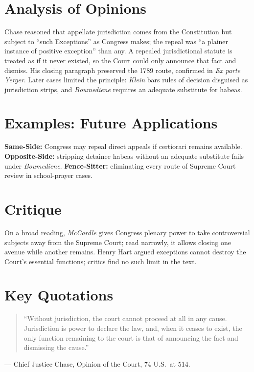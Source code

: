 \documentclass[12pt]{article}
\begin{document}
\section{Analysis of Opinions}
Chase reasoned that appellate jurisdiction comes from the Constitution but subject to ``such Exceptions'' as Congress makes; the repeal was ``a plainer instance of positive exception'' than any. A repealed jurisdictional statute is treated as if it never existed, so the Court could only announce that fact and dismiss. His closing paragraph preserved the 1789 route, confirmed in \textit{Ex parte Yerger}. Later cases limited the principle: \textit{Klein} bars rules of decision disguised as jurisdiction strips, and \textit{Boumediene} requires an adequate substitute for habeas.

\section{Examples: Future Applications}
\textbf{Same-Side:} Congress may repeal direct appeals if certiorari remains available. \textbf{Opposite-Side:} stripping detainee habeas without an adequate substitute fails under \textit{Boumediene}. \textbf{Fence-Sitter:} eliminating every route of Supreme Court review in school-prayer cases.

\section{Critique}
On a broad reading, \textit{McCardle} gives Congress plenary power to take controversial subjects away from the Supreme Court; read narrowly, it allows closing one avenue while another remains. Henry Hart argued exceptions cannot destroy the Court's essential functions; critics find no such limit in the text.

\section{Key Quotations}
\begin{quote}
``Without jurisdiction, the court cannot proceed at all in any cause. Jurisdiction is power to declare the law, and, when it ceases to exist, the only function remaining to the court is that of announcing the fact and dismissing the cause.''
\end{quote}
\noindent --- Chief Justice Chase, Opinion of the Court, 74 U.S.\ at 514.
\end{document}
